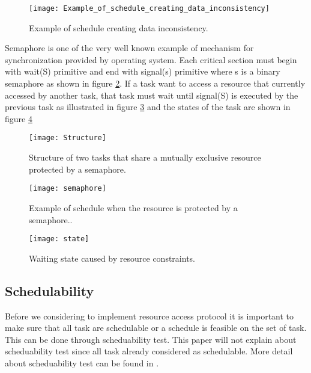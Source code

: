 \begin{figure}[h]
    \centering
    \texttt{[image: Example\_of\_schedule\_creating\_data\_inconsistency]}
    \caption{Example of schedule creating data inconsistency. \cite{b5}}
    \label{fig:Example_of_schedule_creating_data_inconsistency}
\end{figure}

Semaphore is one of the very well known example of mechanism for synchronization provided by operating system. Each critical section must begin with wait(S) primitive and end with signal(s) primitive where s is a binary semaphore as shown in figure \ref{fig:Structure}. If a task want to access a resource that currently accessed by another task, that task must wait until signal(S) is executed by the previous task as illustrated in figure \ref{fig:semaphore} and the states of the task are shown in figure \ref{fig:state}

\begin{figure}[h]
    \centering
    \texttt{[image: Structure]}
    \caption{Structure of two tasks that share a mutually exclusive resource protected by
a semaphore. \cite{b5}}
    \label{fig:Structure}
\end{figure}

\begin{figure}[h]
    \centering
    \texttt{[image: semaphore]}
    \caption{Example of schedule when the resource is protected by a semaphore.. \cite{b5}}
    \label{fig:semaphore}
\end{figure}

\begin{figure}[h]
    \centering
    \texttt{[image: state]}
    \caption{Waiting state caused by resource constraints. \cite{b5}}
    \label{fig:state}
\end{figure}



\subsection{Schedulability}

Before we considering to implement resource access protocol it is important to make sure that all task are schedulable or a schedule is feasible on the set of task. This can be done through scheduability test. This paper will not explain about scheduability test since all task already considered as schedulable. More detail about scheduability test can be found in \cite{b5}.





